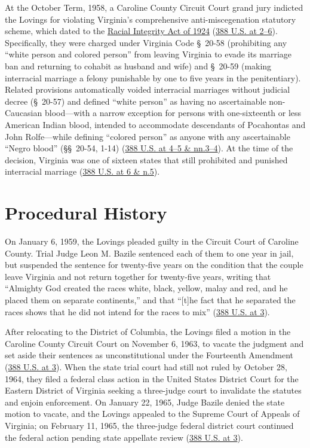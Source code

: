 \documentclass[12pt]{article}
\begin{document}
At the October Term, 1958, a Caroline County Circuit Court grand jury indicted the Lovings for violating Virginia's comprehensive anti-miscegenation statutory scheme, which dated to the \href{https://tile.loc.gov/storage-services/service/ll/usrep/usrep388/usrep388001/usrep388001.pdf}{Racial Integrity Act of 1924} (\href{https://supreme.justia.com/cases/federal/us/388/1/}{388 U.S. at 2--6}). Specifically, they were charged under Virginia Code \S~20-58 (prohibiting any ``white person and colored person'' from leaving Virginia to evade its marriage ban and returning to cohabit as husband and wife) and \S~20-59 (making interracial marriage a felony punishable by one to five years in the penitentiary). Related provisions automatically voided interracial marriages without judicial decree (\S~20-57) and defined ``white person'' as having no ascertainable non-Caucasian blood---with a narrow exception for persons with one-sixteenth or less American Indian blood, intended to accommodate descendants of Pocahontas and John Rolfe---while defining ``colored person'' as anyone with any ascertainable ``Negro blood'' (\S\S~20-54, 1-14) (\href{https://tile.loc.gov/storage-services/service/ll/usrep/usrep388/usrep388001/usrep388001.pdf}{388 U.S. at 4--5 \& nn.3--4}). At the time of the decision, Virginia was one of sixteen states that still prohibited and punished interracial marriage (\href{https://supreme.justia.com/cases/federal/us/388/1/}{388 U.S. at 6 \& n.5}).

\section{Procedural History}
On January 6, 1959, the Lovings pleaded guilty in the Circuit Court of Caroline County. Trial Judge Leon M. Bazile sentenced each of them to one year in jail, but suspended the sentence for twenty-five years on the condition that the couple leave Virginia and not return together for twenty-five years, writing that ``Almighty God created the races white, black, yellow, malay and red, and he placed them on separate continents,'' and that ``[t]he fact that he separated the races shows that he did not intend for the races to mix'' (\href{https://supreme.justia.com/cases/federal/us/388/1/}{388 U.S. at 3}).

After relocating to the District of Columbia, the Lovings filed a motion in the Caroline County Circuit Court on November 6, 1963, to vacate the judgment and set aside their sentences as unconstitutional under the Fourteenth Amendment (\href{https://supreme.justia.com/cases/federal/us/388/1/}{388 U.S. at 3}). When the state trial court had still not ruled by October 28, 1964, they filed a federal class action in the United States District Court for the Eastern District of Virginia seeking a three-judge court to invalidate the statutes and enjoin enforcement. On January 22, 1965, Judge Bazile denied the state motion to vacate, and the Lovings appealed to the Supreme Court of Appeals of Virginia; on February 11, 1965, the three-judge federal district court continued the federal action pending state appellate review (\href{https://supreme.justia.com/cases/federal/us/388/1/}{388 U.S. at 3}).
\end{document}
